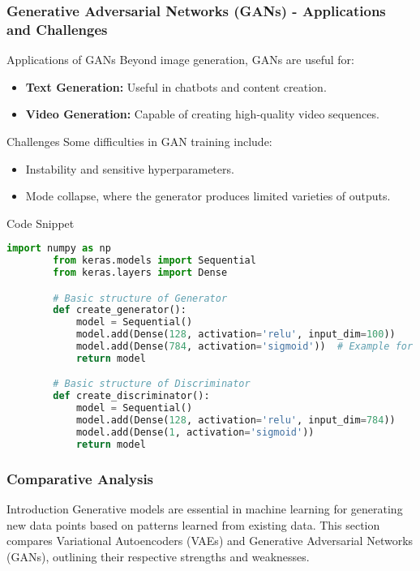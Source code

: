 \documentclass[aspectratio=169]{beamer}
\begin{document}
\begin{frame}[fragile]
    \frametitle{Generative Adversarial Networks (GANs) - Applications and Challenges}
    \begin{block}{Applications of GANs}
        Beyond image generation, GANs are useful for:
        \begin{itemize}
            \item \textbf{Text Generation:} Useful in chatbots and content creation.
            \item \textbf{Video Generation:} Capable of creating high-quality video sequences.
        \end{itemize}
    \end{block}

    \begin{block}{Challenges}
        Some difficulties in GAN training include:
        \begin{itemize}
            \item Instability and sensitive hyperparameters.
            \item Mode collapse, where the generator produces limited varieties of outputs.
        \end{itemize}
    \end{block}

    \begin{block}{Code Snippet}
        \begin{lstlisting}[language=Python]
        import numpy as np
        from keras.models import Sequential
        from keras.layers import Dense

        # Basic structure of Generator
        def create_generator():
            model = Sequential()
            model.add(Dense(128, activation='relu', input_dim=100))
            model.add(Dense(784, activation='sigmoid'))  # Example for generating 28x28 images
            return model

        # Basic structure of Discriminator
        def create_discriminator():
            model = Sequential()
            model.add(Dense(128, activation='relu', input_dim=784))
            model.add(Dense(1, activation='sigmoid'))   
            return model
        \end{lstlisting}
    \end{block}
\end{frame}

\begin{frame}[fragile]
    \frametitle{Comparative Analysis}
    \begin{block}{Introduction}
        Generative models are essential in machine learning for generating new data points based on patterns learned from existing data. This section compares Variational Autoencoders (VAEs) and Generative Adversarial Networks (GANs), outlining their respective strengths and weaknesses.
    \end{block}
\end{frame}
\end{document}
